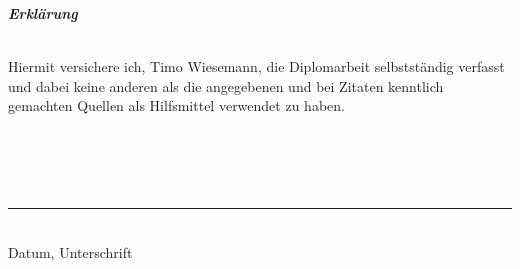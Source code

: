 \newpage
\thispagestyle{empty}

\begin{center}
  \textit{\textbf{Erklärung}}
\end{center}

\hspace*{60mm}\\

Hiermit versichere ich, Timo Wiesemann, die Diplomarbeit selbstständig verfasst und dabei keine anderen als die angegebenen und bei Zitaten kenntlich gemachten Quellen als Hilfsmittel verwendet zu haben.
\bigskip
\\
\\
\\
\\
\\
\begin{minipage}{25cm}
  \begin{flushright}
    \begin{center}
      \rule{7cm}{0.2mm}\\
      Datum, Unterschrift
      \end{center}
  \end{flushright}
\end{minipage}
\newpage
